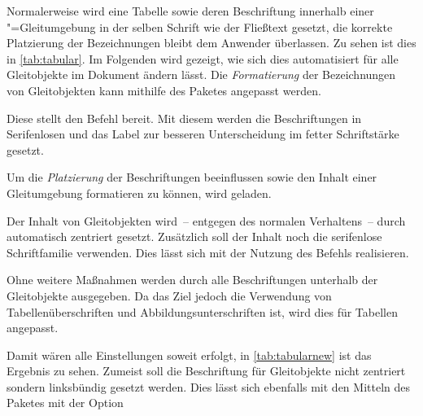 \documentclass[%
  english,ngerman,%
  cdgeometry=no,DIV=12,automark,%
]{tudscrartcl}
\begin{document}
Normalerweise wird eine Tabelle sowie deren Beschriftung innerhalb einer 
"=Gleitumgebung in der selben Schrift wie der Fließtext 
gesetzt, die korrekte Platzierung der Bezeichnungen bleibt dem Anwender 
überlassen. Zu sehen ist dies in \autoref{tab:tabular}. Im Folgenden wird 
gezeigt, wie sich dies automatisiert für alle Gleitobjekte im Dokument ändern 
lässt. Die \emph{Formatierung} der Bezeichnungen von Gleitobjekten kann 
mithilfe des Paketes  angepasst werden.
%
\begin{Preamble}
\usepackage{caption}
\end{Preamble}
%
Diese stellt den Befehl  bereit. Mit diesem werden die 
Beschriftungen in Serifenlosen und das Label zur besseren Unterscheidung im 
fetter Schriftstärke gesetzt.
%
\begin{Preamble*}
\captionsetup{font=sf,labelfont=bf,labelsep=space}
\end{Preamble*}
%
Um die \emph{Platzierung} der Beschriftungen beeinflussen sowie den Inhalt 
einer Gleitumgebung formatieren zu können, wird  geladen. 
\begin{Preamble}
\usepackage{floatrow}
\end{Preamble}
%
Der Inhalt von Gleitobjekten wird~-- entgegen des normalen Verhaltens~-- durch 
 automatisch zentriert gesetzt. Zusätzlich soll der Inhalt 
noch die serifenlose Schriftfamilie verwenden. Dies lässt sich mit der Nutzung 
des Befehls  realisieren.
%
\begin{Preamble*}
\end{Preamble*}
%
Ohne weitere Maßnahmen werden durch  alle Beschriftungen 
unterhalb der Gleitobjekte ausgegeben. Da das Ziel jedoch die Verwendung von 
Tabellenüberschriften und Abbildungsunterschriften ist, wird dies für Tabellen
angepasst.
%
\begin{Preamble*}
\end{Preamble*}
%
\begin{table}
\end{table}%
%
Damit wären alle Einstellungen soweit erfolgt, in \autoref{tab:tabularnew} ist 
das Ergebnis zu sehen. Zumeist soll die Beschriftung für Gleitobjekte nicht 
zentriert sondern linksbündig gesetzt werden. Dies lässt sich ebenfalls mit den 
Mitteln des Paketes  mit der Option  
\end{document}
